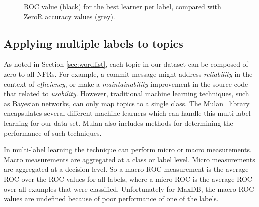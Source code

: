 \documentclass[]{sig-alternate}
\begin{document}
\begin{figure}[ht]
\centering
{}
\label{fig:best-learn-per-tag}
\caption[]{ROC value (black) for the best learner per label, compared with ZeroR accuracy values (grey).}
\end{figure}

\subsection{Applying multiple labels to topics}
As noted in Section \ref{sec:wordlist}, each topic in our dataset can be composed of zero to all NFRs. For example, a commit message might address \textit{reliability} in the context of \textit{efficiency}, or make a \textit{maintainability} improvement in the source code that related to \textit{usability}. However, traditional machine learning techniques, such as Bayesian networks, can only map topics to a single class. The Mulan~\cite{mulan} library encapsulates several different machine learners which can handle this multi-label learning for our data-set. Mulan also includes methods for determining the performance of such techniques.

In multi-label learning the technique can perform micro or macro measurements. Macro measurements are aggregated at a class or label level. Micro measurements are aggregated at a decision level. So a macro-ROC measurement is the average ROC over the ROC values for all labels, where a micro-ROC is the average ROC over all examples that were classified. Unfortunately for MaxDB, the macro-ROC values are undefined because of poor performance of one of the labels.
\end{document}
